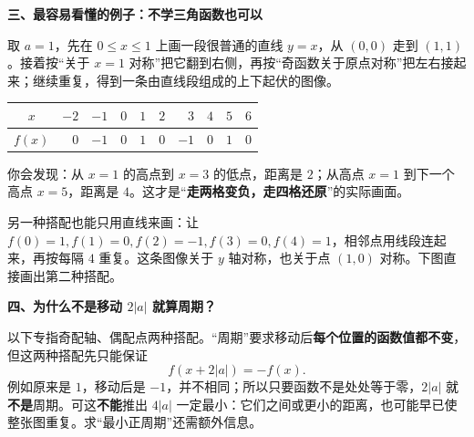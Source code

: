 \clearpage
\begin{explanationbox}
\textbf{\textcolor{CExplanation}{三、最容易看懂的例子：不学三角函数也可以}}



取 $a=1$，先在 $0\le x\le1$ 上画一段很普通的直线 $y=x$，从 $(0,0)$ 走到 $(1,1)$。接着按“关于 $x=1$ 对称”把它翻到右侧，再按“奇函数关于原点对称”把左右接起来；继续重复，得到一条由直线段组成的上下起伏的图像。

\begin{center}
\begin{tabular}{c|rrrrrrrrr}
$x$ & $-2$ & $-1$ & $0$ & $1$ & $2$ & $3$ & $4$ & $5$ & $6$\\ \hline
$f(x)$ & $0$ & $-1$ & $0$ & $1$ & $0$ & $-1$ & $0$ & $1$ & $0$
\end{tabular}
\end{center}
你会发现：从 $x=1$ 的高点到 $x=3$ 的低点，距离是 $2$；从高点 $x=1$ 到下一个高点 $x=5$，距离是 $4$。这才是“\textbf{走两格变负，走四格还原}”的实际画面。

\end{explanationbox}\clearpage\begin{explanationbox}另一种搭配也能只用直线来画：让 $f(0)=1,f(1)=0,f(2)=-1,f(3)=0,f(4)=1$，相邻点用线段连起来，再按每隔 $4$ 重复。这条图像关于 $y$ 轴对称，也关于点 $(1,0)$ 对称。下图直接画出第二种搭配。



\medskip

\end{explanationbox}
\clearpage
\begin{explanationbox}
\textbf{\textcolor{CExplanation}{四、为什么不是移动 $2|a|$ 就算周期？}}



以下专指奇配轴、偶配点两种搭配。“周期”要求移动后\textbf{每个位置的函数值都不变}，但这两种搭配先只能保证
\[f(x+2|a|)=-f(x).\]
例如原来是 $1$，移动后是 $-1$，并不相同；所以只要函数不是处处等于零，$2|a|$ 就\textbf{不是}周期。可这\textbf{不能}推出 $4|a|$ 一定最小：它们之间或更小的距离，也可能早已使整张图重复。求“最小正周期”还需额外信息。

\medskip

\end{explanationbox}
\clearpage
